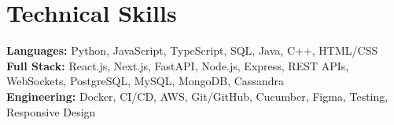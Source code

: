 \documentclass[letterpaper,11pt]{article}
\begin{document}
\section{Technical Skills}
\begin{itemize}[leftmargin=0.15in, label={}]
  \small{\item{
    \textbf{Languages:} Python, JavaScript, TypeScript, SQL, Java, C++, HTML/CSS \\
    \textbf{Full Stack:} React.js, Next.js, FastAPI, Node.js, Express, REST APIs, WebSockets, PostgreSQL, MySQL, MongoDB, Cassandra \\
    \textbf{Engineering:} Docker, CI/CD, AWS, Git/GitHub, Cucumber, Figma, Testing, Responsive Design
  }}
\end{itemize}
\end{document}
